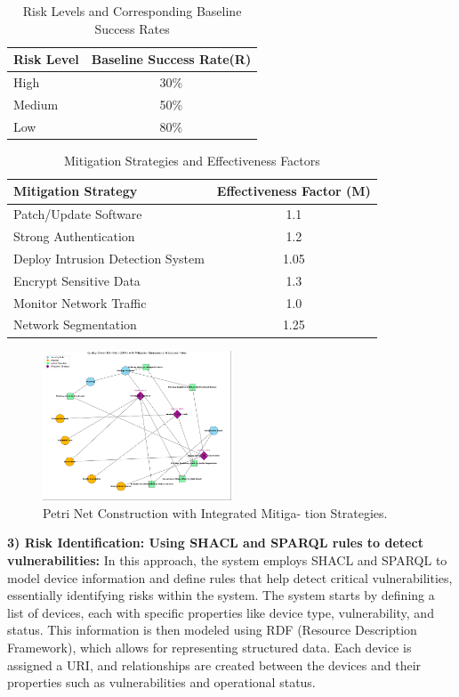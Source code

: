 \documentclass[conference]{IEEEtran}
\begin{document}
\begin{table}[h]
\caption{Risk Levels and Corresponding Baseline Success Rates}
\label{tab:simulation_metrics}
\centering
\begin{tabular}{|l|c|}
\hline
\textbf{Risk Level} & \textbf{Baseline Success Rate(R)} \\ \hline
High & 30\% \\ \hline
Medium & 50\% \\ \hline
Low & 80\% \\ \hline
\end{tabular}
\end{table}

\begin{table}[H]
\caption{Mitigation Strategies and Effectiveness Factors}
\label{tab:simulation_metrics}
\centering
\begin{tabular}{|l|c|}
\hline
\textbf{Mitigation Strategy} & \textbf{Effectiveness Factor (M)} \\ \hline
Patch/Update Software &	1.1 \\ \hline
Strong Authentication &	1.2 \\ \hline
Deploy Intrusion Detection System & 1.05 \\ \hline
Encrypt Sensitive Data & 1.3 \\ \hline
Monitor Network Traffic	& 1.0 \\ \hline
Network Segmentation & 1.25 \\ \hline
\end{tabular}
\end{table}

\begin{figure}[h!]
    \centering
    \includegraphics[width=0.5\textwidth]{pnets.png} 
    \caption{Petri Net Construction with Integrated Mitiga-
tion Strategies.}
    \label{fig:myimage}
\end{figure}

\textbf{3) Risk Identification: Using SHACL and SPARQL rules to detect vulnerabilities:} In this approach, the system employs SHACL and SPARQL to model device information and define rules that help detect critical vulnerabilities, essentially identifying risks within the system. The system starts by defining a list of devices, each with specific properties like device type, vulnerability, and status. This information is then modeled using RDF (Resource Description Framework), which allows for representing structured data. Each device is assigned a URI, and relationships are created between the devices and their properties such as vulnerabilities and operational status.
\end{document}
